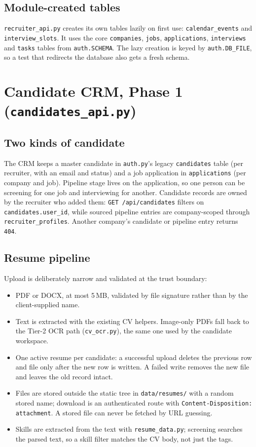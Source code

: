 \documentclass[11pt,a4paper]{article}
\newcommand{\file}[1]{\texttt{\small #1}}
\newcommand{\code}[1]{\texttt{#1}}
\begin{document}
\subsection{Module-created tables}
\file{recruiter\_api.py} creates its own tables lazily on first use:
\code{calendar\_events} and \code{interview\_slots}. It uses the core
\code{companies}, \code{jobs}, \code{applications}, \code{interviews} and
\code{tasks} tables from \file{auth.SCHEMA}. The lazy creation is keyed by
\code{auth.DB\_FILE}, so a test that redirects the database also gets a fresh
schema.

\section{Candidate CRM, Phase 1 (\file{candidates\_api.py})}
\label{u:cand}

\subsection{Two kinds of candidate}
The CRM keeps a master candidate in \file{auth.py}'s legacy \code{candidates}
table (per recruiter, with an email and status) and a job application in
\code{applications} (per company and job). Pipeline stage lives on the
application, so one person can be screening for one job and interviewing for
another. Candidate records are owned by the recruiter who added them:
\code{GET /api/candidates} filters on \code{candidates.user\_id}, while sourced
pipeline entries are company-scoped through \code{recruiter\_profiles}.
Another company's candidate or pipeline entry returns \code{404}.

\subsection{Resume pipeline}
Upload is deliberately narrow and validated at the trust boundary:
\begin{itemize}[leftmargin=2em]
  \item PDF or DOCX, at most 5\,MB, validated by file signature rather than
        by the client-supplied name.
  \item Text is extracted with the existing CV helpers. Image-only PDFs fall
        back to the Tier-2 OCR path (\file{cv\_ocr.py}), the same one used by
        the candidate workspace.
  \item One active resume per candidate: a successful upload deletes the
        previous row and file only after the new row is written. A failed
        write removes the new file and leaves the old record intact.
  \item Files are stored outside the static tree in \file{data/resumes/} with
        a random stored name; download is an authenticated route with
        \code{Content-Disposition: attachment}. A stored file can never be
        fetched by URL guessing.
  \item Skills are extracted from the text with \file{resume\_data.py};
        screening searches the parsed text, so a skill filter matches the CV
        body, not just the tags.
\end{itemize}
\end{document}
